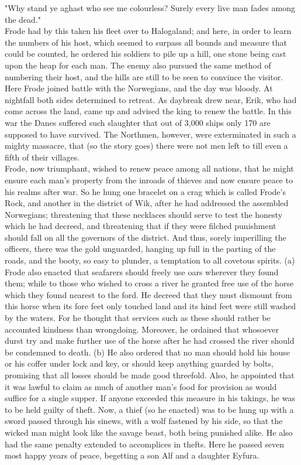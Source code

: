 \documentclass[10pt,a4paper]{report}
\begin{document}
"Why stand ye aghast who see me colourless? Surely every live man fades among the dead."\\

Frode had by this taken his fleet over to Halogaland; and here, in order to learn the numbers of his host, which seemed to surpass all bounds and measure that could be counted, he ordered his soldiers to pile up a hill, one stone being cast upon the heap for each man. The enemy also pursued the same method of numbering their host, and the hills are still to be seen to convince the visitor. Here Frode joined battle with the Norwegians, and the day was bloody. At nightfall both sides determined to retreat. As daybreak drew near, Erik, who had come across the land, came up and advised the king to renew the battle. In this war the Danes suffered such slaughter that out of 3,000 ships only 170 are supposed to have survived. The Northmen, however, were exterminated in such a mighty massacre, that (so the story goes) there were not men left to till even a fifth of their villages.\\

Frode, now triumphant, wished to renew peace among all nations, that he might ensure each man's property from the inroads of thieves and now ensure peace to his realms after war. So he hung one bracelet on a crag which is called Frode's Rock, and another in the district of Wik, after he had addressed the assembled Norwegians; threatening that these necklaces should serve to test the honesty which he had decreed, and threatening that if they were filched punishment should fall on all the governors of the district. And thus, sorely imperilling the officers, there was the gold unguarded, hanging up full in the parting of the roads, and the booty, so easy to plunder, a temptation to all covetous spirits. (a) Frode also enacted that seafarers should freely use oars wherever they found them; while to those who wished to cross a river he granted free use of the horse which they found nearest to the ford. He decreed that they must dismount from this horse when its fore feet only touched land and its hind feet were still washed by the waters. For he thought that services such as these should rather be accounted kindness than wrongdoing. Moreover, he ordained that whosoever durst try and make further use of the horse after he had crossed the river should be condemned to death. (b) He also ordered that no man should hold his house or his coffer under lock and key, or should keep anything guarded by bolts, promising that all losses should be made good threefold. Also, he appointed that it was lawful to claim as much of another man's food for provision as would suffice for a single supper. If anyone exceeded this measure in his takings, he was to be held guilty of theft. Now, a thief (so he enacted) was to be hung up with a sword passed through his sinews, with a wolf fastened by his side, so that the wicked man might look like the savage beast, both being punished alike. He also had the same penalty extended to accomplices in thefts. Here he passed seven most happy years of peace, begetting a son Alf and a daughter Eyfura.\\
\end{document}
